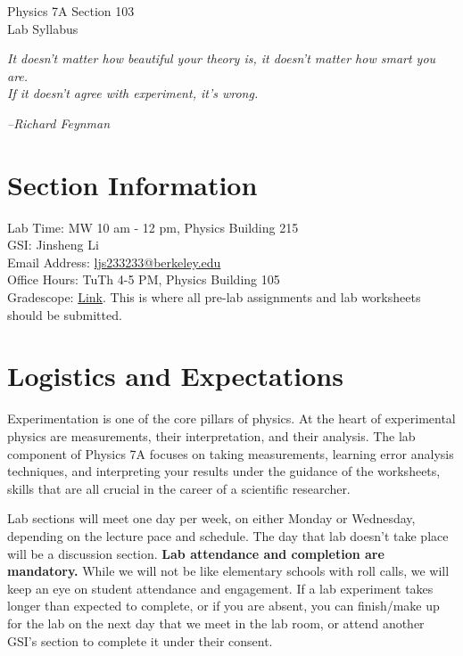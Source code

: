 \documentclass[11pt]{article}
\theoremstyle{gangnamstyle}{\newtheorem{definition}{Definition}[]}
\theoremstyle{gangnamstyle}{\newtheorem{example}{Example}[]}
\theoremstyle{gangnamstyle}{\newtheorem{problem}{Problem}[]}
\theoremstyle{gangnamstyle}{\newtheorem{warning}{Warning}[]}
\begin{document}
\normalfont
\pagestyle{pages}


\begin{center}
\vspace{3in}
{\Large Physics 7A Section 103 } \\[0.05in]
Lab Syllabus \\ [0.5in]
\end{center}


\begin{center}
 \textit{It doesn't matter how beautiful your theory is, it doesn't matter how smart you are. \\
If it doesn't agree with experiment, it's wrong.}   
\end{center}
\hfill \textit{--Richard Feynman}

\section*{Section Information}
Lab Time: MW 10 am - 12 pm, Physics Building 215 \\
GSI: Jinsheng Li \\
Email Address: \href{mailto:ljs233233@berkeley.edu}{ljs233233@berkeley.edu} \\
Office Hours: TuTh 4-5 PM, Physics Building 105 \\
Gradescope: \href{https://www.gradescope.com/courses/801142}{Link}. This is where all pre-lab assignments and lab worksheets should be submitted. 

\section*{Logistics and Expectations}

Experimentation is one of the core pillars of physics. At the heart of experimental physics are measurements, their interpretation, and their analysis. The lab component of Physics 7A focuses on taking measurements, learning error analysis techniques, and interpreting your results under the guidance of the worksheets, skills that are all crucial in the career of a scientific researcher. 

Lab sections will meet one day per week, on either Monday or Wednesday, depending on the lecture pace and schedule. The day that lab doesn't take place will be a discussion section. \textbf{Lab attendance and completion are mandatory.} While we will not be like elementary schools with roll calls, we will keep an eye on student attendance and engagement. If a lab experiment takes longer than expected to complete, or if you are absent, you can finish/make up for the lab on the next day that we meet in the lab room, or attend another GSI's section to complete it under their consent. 
\end{document}
